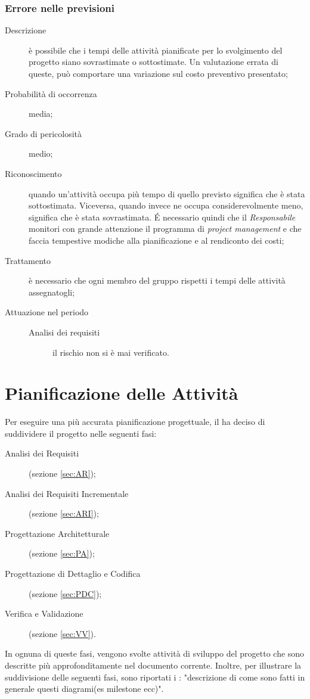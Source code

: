 		\subsubsection{Errore nelle previsioni}
		\begin{description}
			\item[Descrizione] è possibile che i tempi delle attività pianificate per lo svolgimento del progetto siano sovrastimate o sottostimate. Un valutazione errata di queste, può comportare una variazione sul costo preventivo presentato; 
			\item[Probabilità di occorrenza] media;
			\item[Grado di pericolosità] medio;
			\item[Riconoscimento] quando un'attività occupa più tempo di quello previsto significa che è stata sottostimata. Viceversa, quando invece ne occupa considerevolmente meno, significa che è stata sovrastimata. É necessario quindi che il \emph{Responsabile} monitori con grande attenzione il programma di \emph{project management} e che faccia tempestive modiche alla pianificazione e al rendiconto dei costi; 
			\item[Trattamento] è necessario che ogni membro del gruppo rispetti i tempi delle attività assegnatogli; 
			\item[Attuazione nel periodo]
			\begin{description}
				\item[Analisi dei requisiti]  il rischio non si è mai verificato.
			\end{description}
		\end{description}
\section{Pianificazione delle Attività} \label{sec:pianificazione}
Per eseguire una più accurata pianificazione progettuale, il  ha deciso di suddividere il progetto nelle seguenti fasi:
\begin{description}
	\item[Analisi dei Requisiti](sezione \ref{sec:AR});
	\item[Analisi dei Requisiti Incrementale](sezione \ref{sec:ARI});
	\item[Progettazione Architetturale](sezione \ref{sec:PA});
	\item[Progettazione di Dettaglio e Codifica](sezione \ref{sec:PDC});
	\item[Verifica e Validazione](sezione \ref{sec:VV}).
\end{description}
In ognuna di queste fasi, vengono svolte attività di sviluppo del progetto che sono descritte più approfonditamente nel documento corrente.
Inoltre, per illustrare la suddivisione delle seguenti fasi, sono riportati i :
"descrizione di come sono fatti in generale 
questi diagrami(es milestone ecc)".


